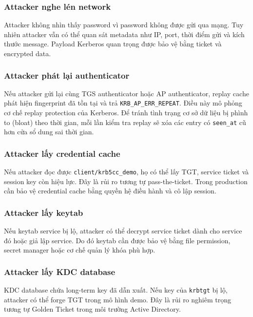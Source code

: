 \documentclass[12pt]{article}
\begin{document}
\subsubsection{Attacker nghe lén network}

Attacker không nhìn thấy password vì password không được gửi qua mạng. Tuy nhiên attacker vẫn có thể quan sát metadata như IP, port, thời điểm gửi và kích thước message. Payload Kerberos quan trọng được bảo vệ bằng ticket và encrypted data.

\subsubsection{Attacker phát lại authenticator}

Nếu attacker gửi lại cùng TGS authenticator hoặc AP authenticator, replay cache phát hiện fingerprint đã tồn tại và trả \texttt{KRB\_AP\_ERR\_REPEAT}. Điều này mô phỏng cơ chế replay protection của Kerberos. Để tránh tình trạng cơ sở dữ liệu bị phình to (bloat) theo thời gian, mỗi lần kiểm tra replay sẽ xóa các entry có \texttt{seen\_at} cũ hơn cửa sổ dung sai thời gian.

\subsubsection{Attacker lấy credential cache}

Nếu attacker đọc được \texttt{client/krb5cc\_demo}, họ có thể lấy TGT, service ticket và session key còn hiệu lực. Đây là rủi ro tương tự pass-the-ticket. Trong production cần bảo vệ credential cache bằng quyền hệ điều hành và cô lập session.

\subsubsection{Attacker lấy keytab}

Nếu keytab service bị lộ, attacker có thể decrypt service ticket dành cho service đó hoặc giả lập service. Do đó keytab cần được bảo vệ bằng file permission, secret manager hoặc cơ chế quản lý khóa phù hợp.

\subsubsection{Attacker lấy KDC database}

KDC database chứa long-term key đã dẫn xuất. Nếu key của \texttt{krbtgt} bị lộ, attacker có thể forge TGT trong mô hình demo. Đây là rủi ro nghiêm trọng tương tự Golden Ticket trong môi trường Active Directory.
\end{document}

